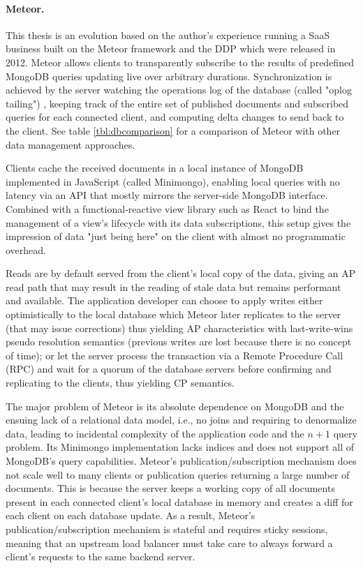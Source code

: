 \paragraph{Meteor.} This thesis is an evolution based on the author's experience running a \gls{SaaS} business built on the Meteor \cite{schmidt2014live} framework and the \gls{DDP} \cite{ddpspec} which were released in 2012. Meteor allows clients to transparently subscribe to the results of predefined MongoDB queries updating live over arbitrary durations. Synchronization is achieved by the server watching the operations log of the database (called "oplog tailing") \cite{wingerath2019real}, keeping track of the entire set of published documents and subscribed queries for each connected client, and computing delta changes to send back to the client. See table \ref{tbl:dbcomparison} for a comparison of Meteor with other data management approaches.

Clients cache the received documents in a local instance of MongoDB implemented in JavaScript (called Minimongo), enabling local queries with no latency via an API that mostly mirrors the server-side MongoDB interface. Combined with a functional-reactive view library such as React to bind the management of a view's lifecycle with its data subscriptions, this setup gives the impression of data "just being here" on the client with almost no programmatic overhead.

\cleardoublepage
Reads are by default served from the client's local copy of the data, giving an AP read path that may result in the reading of stale data but remains performant and available. The application developer can choose to apply writes either optimistically to the local database which Meteor later replicates to the server (that may issue corrections) thus yielding AP characteristics with last-write-wins pseudo resolution semantics (previous writes are lost because there is no concept of time); or let the server process the transaction via a Remote Procedure Call (RPC) and wait for a quorum of the database servers before confirming and replicating to the clients, thus yielding CP semantics.

The major problem of Meteor is its absolute dependence on MongoDB and the ensuing lack of a relational data model, i.e., no joins and requiring to denormalize data, leading to incidental complexity of the application code and the $n+1$ query problem. Its Minimongo implementation lacks indices and does not support all of MongoDB's query capabilities. Meteor's publication/subscription mechanism does not scale well to many clients or publication queries returning a large number of documents. This is because the server keeps a working copy of all documents present in each connected client's local database in memory and creates a diff for each client on each database update. As a result, Meteor's publication/subscription mechanism is stateful and requires sticky sessions, meaning that an upstream load balancer must take care to always forward a client's requests to the same backend server.

